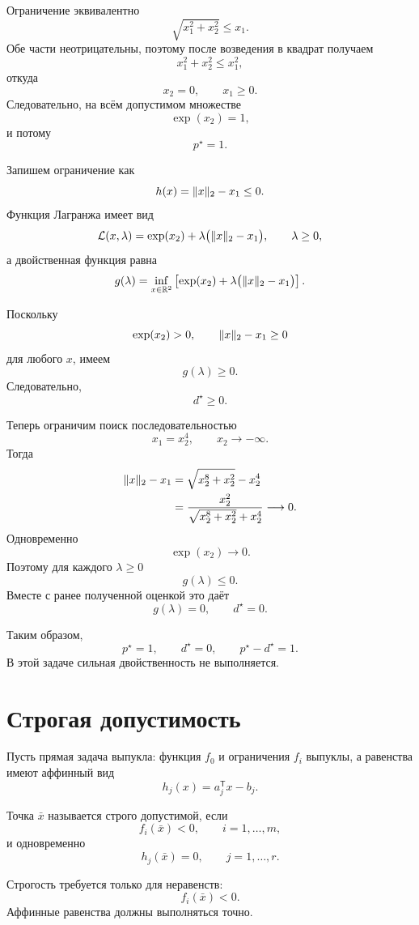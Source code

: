 Ограничение эквивалентно
\[
    \sqrt{x_1^2+x_2^2}\le x_1.
\]
Обе части неотрицательны, поэтому после возведения в квадрат
получаем
\[
    x_1^2+x_2^2\le x_1^2,
\]
откуда
\[
    x_2=0,
    \qquad
    x_1\ge0.
\]
Следовательно, на всём допустимом множестве
\[
    \exp(x_2)=1,
\]
и потому
\[
    p^\star=1.
\]

Запишем ограничение как
\[
    h(x)
    =
    \lVert x\rVert_2-x_1
    \le0.
\]
Функция Лагранжа имеет вид
\[
    \mathcal L(x,\lambda)
    =
    \exp(x_2)
    +
    \lambda\bigl(\lVert x\rVert_2-x_1\bigr),
    \qquad
    \lambda\ge0,
\]
а двойственная функция равна
\[
    g(\lambda)
    =
    \inf_{x\in\mathbb{R}^2}
    \left[
        \exp(x_2)
        +
        \lambda\bigl(\lVert x\rVert_2-x_1\bigr)
    \right].
\]

Поскольку
\[
    \exp(x_2)>0,
    \qquad
    \lVert x\rVert_2-x_1\ge0
\]
для любого \(x\), имеем
\[
    g(\lambda)\ge0.
\]
Следовательно,
\[
    d^\star\ge0.
\]

Теперь ограничим поиск последовательностью
\[
    x_1=x_2^4,
    \qquad
    x_2\to-\infty.
\]
Тогда
\[
\begin{aligned}
    \lVert x\rVert_2-x_1
    &=
    \sqrt{x_2^8+x_2^2}-x_2^4
    \\
    &=
    \frac{x_2^2}{
        \sqrt{x_2^8+x_2^2}+x_2^4
    }
    \longrightarrow0.
\end{aligned}
\]
Одновременно
\[
    \exp(x_2)\longrightarrow0.
\]
Поэтому для каждого \(\lambda\ge0\)
\[
    g(\lambda)\le0.
\]
Вместе с ранее полученной оценкой это даёт
\[
    g(\lambda)=0,
    \qquad
    d^\star=0.
\]

Таким образом,
\[
    p^\star=1,
    \qquad
    d^\star=0,
    \qquad
    p^\star-d^\star=1.
\]
В этой задаче сильная двойственность не выполняется.

\section{Строгая допустимость}

Пусть прямая задача выпукла: функция \(f_0\) и ограничения
\(f_i\) выпуклы, а равенства имеют аффинный вид
\[
    h_j(x)=a_j^{\mathsf T}x-b_j.
\]

\begin{definition}
Точка \(\bar x\) называется строго допустимой, если
\[
    f_i(\bar x)<0,
    \qquad i=1,\ldots,m,
\]
и одновременно
\[
    h_j(\bar x)=0,
    \qquad j=1,\ldots,r.
\]
\end{definition}

Строгость требуется только для неравенств:
\[
    f_i(\bar x)<0.
\]
Аффинные равенства должны выполняться точно.

